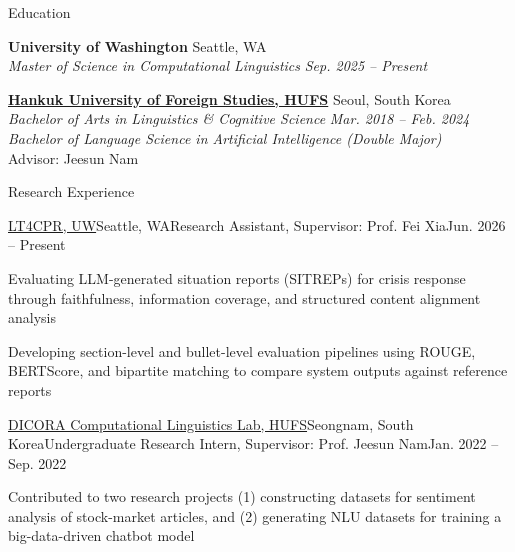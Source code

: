 \documentclass[
	11pt, %
]{resume} %
\begin{document}

\begin{rSection}{Education}
	
	\textbf{University of Washington} \hfill Seattle, WA \\ 
	\textsl{Master of Science in Computational Linguistics} \hfill
    \textsl{Sep. 2025 -- Present}

    \textbf{\href{https://www.hufs.ac.kr/hufs/index.do\#section1}{Hankuk University of Foreign Studies, HUFS}} \hfill Seoul, South Korea \\
    \textsl{Bachelor of Arts in Linguistics \& Cognitive Science} \hfill
    \textsl{Mar. 2018 -- Feb. 2024} \\
	\textsl{Bachelor of Language Science in Artificial Intelligence (Double Major)}\\
    Advisor: Jeesun Nam

\end{rSection}


\begin{rSection}{Research Experience}
	\begin{rSubsection}{\href{https://faculty.washington.edu/fxia/}{LT4CPR, UW}}{Seattle, WA}{Research Assistant, Supervisor: Prof. Fei Xia}{Jun. 2026 -- Present}
		\item Evaluating LLM-generated situation reports (SITREPs) for crisis response through faithfulness, information coverage, and structured content alignment analysis
        \item Developing section-level and bullet-level evaluation pipelines using ROUGE, BERTScore, and bipartite matching to compare system outputs against reference reports
	\end{rSubsection}

    \begin{rSubsection}{\href{http://dicora.kr/}{DICORA Computational Linguistics Lab, HUFS}}{Seongnam, South Korea}{Undergraduate Research Intern, Supervisor: Prof. Jeesun Nam}{Jan. 2022 -- Sep. 2022}
		\item Contributed to two research projects (1) constructing datasets for sentiment analysis of stock-market articles, and (2) generating NLU datasets for training a big-data-driven chatbot model 
	\end{rSubsection}

\end{rSection}
\end{document}
